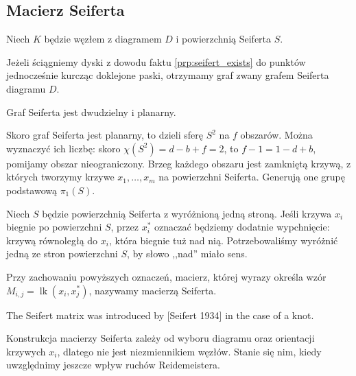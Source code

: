 \subsection{Macierz Seiferta}
Niech $K$ będzie węzłem z diagramem $D$ i powierzchnią Seiferta $S$.

\begin{definition}
    Jeżeli ściągniemy dyski z dowodu faktu \ref{prp:seifert_exists} do punktów jednocześnie kurcząc doklejone paski, otrzymamy graf zwany grafem Seiferta diagramu $D$.
\end{definition}

\begin{proposition}
    Graf Seiferta jest dwudzielny i planarny.
\end{proposition}

Skoro graf Seiferta jest planarny, to dzieli sferę $S^2$ na $f$ obszarów.
Można wyznaczyć ich liczbę: skoro $\chi(S^2) = d - b + f = 2$, to $f - 1 = 1 - d + b$, pomijamy obszar nieograniczony.
Brzeg każdego obszaru jest zamkniętą krzywą, z których tworzymy krzywe $x_1, \ldots, x_m$ na powierzchni Seiferta.
Generują one grupę podstawową $\pi_1(S)$.

Niech $S$ będzie powierzchnią Seiferta z wyróżnioną jedną stroną.
Jeśli krzywa $x_i$ biegnie po powierzchni $S$, przez $x_i^*$ oznaczać będziemy dodatnie wypchnięcie: krzywą równoległą do $x_i$, która biegnie tuż nad nią.
Potrzebowaliśmy wyróżnić jedną ze stron powierzchni $S$, by słowo ,,nad'' miało sens.

\begin{definition}
    Przy zachowaniu powyższych oznaczeń, macierz, której wyrazy określa wzór $M_{i,j} = \operatorname{lk}(x_i, x_j^*)$, nazywamy macierzą Seiferta.
\end{definition}

\begin{tobedone}
The Seifert matrix was introduced by [Seifert 1934] in the case of a knot.
\end{tobedone}

Konstrukcja macierzy Seiferta zależy od wyboru diagramu oraz orientacji krzywych $x_i$, dlatego nie jest niezmiennikiem węzłów.
Stanie się nim, kiedy uwzględnimy jeszcze wpływ ruchów Reidemeistera.

